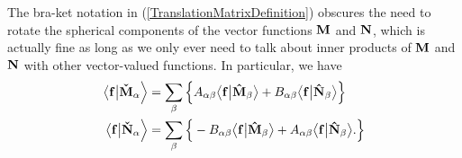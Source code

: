 The bra-ket notation in (\ref{TranslationMatrixDefinition})
obscures the need to rotate the spherical components of the
vector functions $\mathbf{M}$ and $\mathbf{N}$, which is actually fine  
as long as we only ever need to talk about inner products
of $\mathbf{M}$ and $\mathbf{N}$ with other vector-valued functions.
In particular, we have
\begin{align*}
 \big\langle \mathbf{f} \big| \mathbf{\check M}_\alpha \Big>
&= \sum_{\beta } \Big\{ 
   A_{\alpha\beta} \big\langle \mathbf{f} \big| \mathbf{\hat M}_\beta \big>
  +B_{\alpha\beta} \big\langle \mathbf{f} \big| \mathbf{\hat N}_\beta \big>
  \Big\} 
\\
 \big\langle \mathbf{f} \big| \mathbf{\check N}_\alpha \Big>
&= \sum_\beta \Big\{ 
   -B_{\alpha\beta} \big\langle \mathbf{f} \big| \mathbf{\hat M}_\beta \big>
   +A_{\alpha\beta} \big\langle \mathbf{f} \big| \mathbf{\hat N}_\beta \big>.
  \Big\}
\end{align*}
